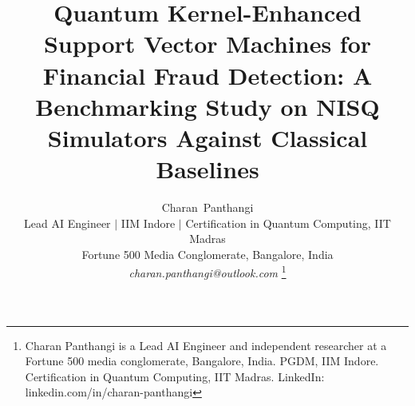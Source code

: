 \documentclass[journal]{IEEEtran}
\begin{document}
\title{Quantum Kernel-Enhanced Support Vector Machines 
for Financial Fraud Detection: A Benchmarking Study 
on NISQ Simulators Against Classical Baselines}

\author{Charan~Panthangi\\
\small Lead AI Engineer $|$ IIM Indore $|$ Certification in Quantum Computing, IIT Madras\\
\small Fortune 500 Media Conglomerate, Bangalore, India\\
\small \textit{charan.panthangi@outlook.com}
\thanks{Charan Panthangi is a Lead AI Engineer and independent researcher 
at a Fortune 500 media conglomerate, Bangalore, India. PGDM, IIM Indore. 
Certification in Quantum Computing, IIT Madras. 
LinkedIn: linkedin.com/in/charan-panthangi}}

\maketitle
\end{document}
